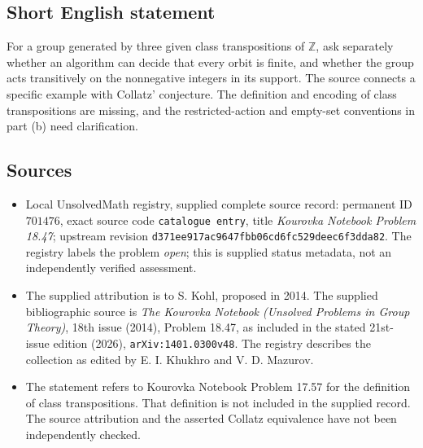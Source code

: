 \documentclass[11pt]{article}
\newcommand{\Z}{\mathbb{Z}}
\begin{document}
\subsection{Short English statement}
For a group generated by three given class transpositions of \(\Z\), ask separately whether an algorithm can decide that every orbit is finite, and whether the group acts transitively on the nonnegative integers in its support. The source connects a specific example with Collatz' conjecture. The definition and encoding of class transpositions are missing, and the restricted-action and empty-set conventions in part (b) need clarification.
\subsection{Sources}
\begin{itemize}
\item Local UnsolvedMath registry, supplied complete source record: permanent ID \(701476\), exact source code \texttt{catalogue entry}, title \emph{Kourovka Notebook Problem 18.47}; upstream revision \texttt{d371ee917ac9647fbb06cd6fc529deec6f3dda82}. The registry labels the problem \emph{open}; this is supplied status metadata, not an independently verified assessment.
\item The supplied attribution is to S. Kohl, proposed in 2014. The supplied bibliographic source is \emph{The Kourovka Notebook (Unsolved Problems in Group Theory)}, 18th issue (2014), Problem 18.47, as included in the stated 21st-issue edition (2026), \texttt{arXiv:1401.0300v48}. The registry describes the collection as edited by E. I. Khukhro and V. D. Mazurov.
\item The statement refers to Kourovka Notebook Problem 17.57 for the definition of class transpositions. That definition is not included in the supplied record. The source attribution and the asserted Collatz equivalence have not been independently checked.
\end{itemize}
\end{document}
